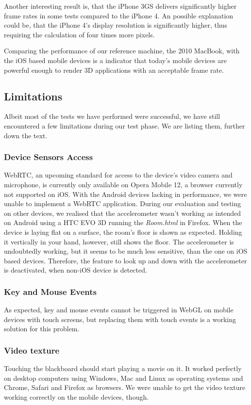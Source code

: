 \documentclass[12pt,journal,compsoc]{IEEEtran}
\begin{document}
Another interesting result is, that the iPhone 3GS delivers significantly higher frame rates in some tests compared to the iPhone 4. An possible explanation could be, that the iPhone 4’s display resolution is significantly higher, thus requiring the calculation of four times more pixels. 

Comparing the performance of our reference machine, the 2010 MacBook, with the iOS based mobile devices is a indicator that today's mobile devices are powerful enough to render 3D applications with an acceptable frame rate.

\subsection{Limitations}
Albeit most of the tests we have performed were successful, we have still encountered a few limitations during our test phase. We are listing them, further down the text.

\subsubsection{Device Sensors Access}\label{deviceSensors}
WebRTC, an upcoming standard for access to the device’s video camera and microphone, is currently only available on Opera Mobile 12, a browser currently not supported on iOS. With the Android devices lacking in performance, we were unable to implement a WebRTC application.
During our evaluation and testing on other devices, we realised that the accelerometer wasn’t working as intended on Android using a HTC EVO 3D running the \textit{Room.html} in Firefox. When the device is laying flat on a surface, the room’s floor is shown as expected. Holding it vertically in your hand, however, still shows the floor. The accelerometer is undoubtedly working, but it seems to be much less sensitive, than the one on iOS based devices. Therefore, the feature to look up and down with the accelerometer is deactivated, when non-iOS device is detected.

\subsubsection{Key and Mouse Events}
As expected, key and mouse events cannot be triggered in WebGL on mobile devices with touch screens, but replacing them with touch events is a working solution for this problem.

\subsubsection{Video texture}
Touching the blackboard should start playing a movie on it. It worked perfectly on desktop computers using Windows, Mac and Linux as operating systems and Chrome, Safari and Firefox as browsers. We were unable to get the video texture working correctly on the mobile devices, though.
\end{document}
